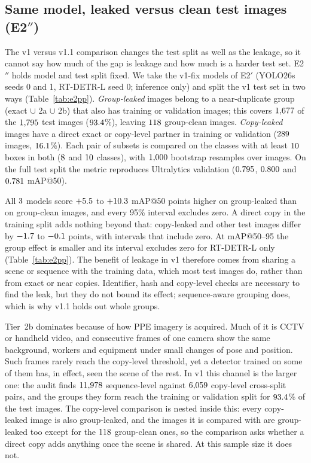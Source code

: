 \documentclass[review,12pt]{elsarticle}
\begin{document}
\subsection{Same model, leaked versus clean test images (E2$''$)}
\label{sec:e2pp}
The v1 versus v1.1 comparison changes the test split as well as the
leakage, so it cannot say how much of the gap is leakage and how much
is a harder test set. E2$''$ holds model and test split fixed. We take
the v1-fix models of E2$'$ (YOLO26s seeds 0 and 1, RT-DETR-L seed 0;
inference only) and split the v1 test set in two ways
(Table~\ref{tab:e2pp}). \emph{Group-leaked} images belong to a
near-duplicate group (exact $\cup$ 2a $\cup$ 2b) that also has training
or validation images; this covers $1{,}677$ of the $1{,}795$
test images ($93.4$\%), leaving $118$ group-clean
images. \emph{Copy-leaked} images have a direct exact or copy-level
partner in training or validation ($289$ images,
$16.1$\%). Each pair of subsets is compared on the classes with
at least $10$ boxes in both ($8$ and $10$
classes), with $1{,}000$ bootstrap resamples over images. On the full
test split the metric reproduces Ultralytics validation
($0.795$, $0.800$ and $0.781$ mAP@50).

All $3$ models score $+5.5$ to
$+10.3$ mAP@50 points higher on group-leaked than on
group-clean images, and every 95\% interval excludes zero. A direct copy
in the training split adds nothing beyond that: copy-leaked and other
test images differ by $-1.7$ to $-0.1$ points,
with intervals that include zero. At mAP@50--95 the group effect is
smaller and its interval excludes zero for RT-DETR-L only
(Table~\ref{tab:e2pp}). The benefit of leakage in v1 therefore comes
from sharing a scene or sequence with the training data, which most
test images do, rather than from exact or near copies. Identifier, hash
and copy-level checks are necessary to find the leak, but they do not
bound its effect; sequence-aware grouping does, which is why v1.1 holds
out whole groups.

Tier~2b dominates because of how PPE imagery is acquired. Much of it is
CCTV or handheld video, and consecutive frames of one camera show the
same background, workers and equipment under small changes of pose and
position. Such frames rarely reach the copy-level threshold, yet a
detector trained on some of them has, in effect, seen the scene of the
rest. In v1 this channel is the larger one: the audit finds
$11{,}978$ sequence-level against $6{,}059$ copy-level cross-split
pairs, and the groups they form reach the training or validation split
for $93.4$\% of the test images. The copy-level comparison is
nested inside this: every copy-leaked image is also group-leaked, and
the images it is compared with are group-leaked too except for the
$118$ group-clean ones, so the comparison asks whether a
direct copy adds anything once the scene
is shared. At this sample size it does not.
\end{document}
